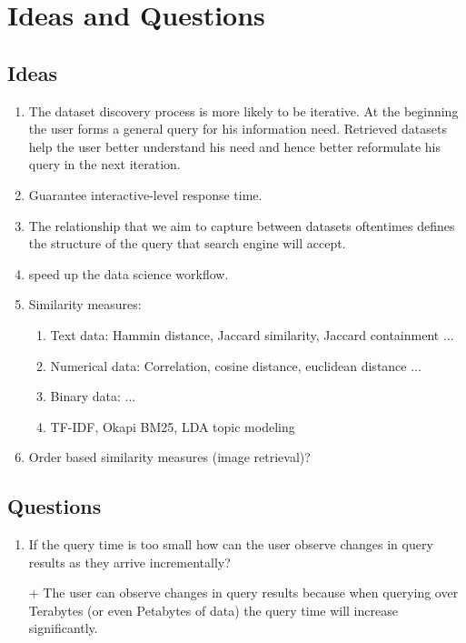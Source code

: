 
\section{Ideas and Questions}
\label{sec:ideas}

\subsection{Ideas}
\begin{enumerate}
	\item The dataset discovery process is more likely to be iterative. At the beginning the user forms a general query for his information need. Retrieved datasets help the user better understand his need and hence better reformulate his query in the next iteration.
	
	\item Guarantee interactive-level response time.
	\item The relationship that we aim to capture between datasets oftentimes defines the structure of the query that search engine will accept.
	\item speed up the data science workflow.
	
	
	\item Similarity measures:
	\begin{enumerate}
		\item Text data: Hammin distance, Jaccard similarity, Jaccard containment ...
		\item Numerical data: Correlation, cosine distance, euclidean distance ...
		\item Binary data: ...
		\item TF-IDF, Okapi BM25, LDA topic modeling
	\end{enumerate}
	\item Order based similarity measures (image retrieval)?
\end{enumerate}

\subsection{Questions}
\begin{enumerate}
	\item If the query time is too small how can the user observe changes in query results as they arrive incrementally? 
	
	\item [+] The user can observe changes in query results because when querying over Terabytes (or even Petabytes of data) the query time will increase significantly.
	
	
\end{enumerate}